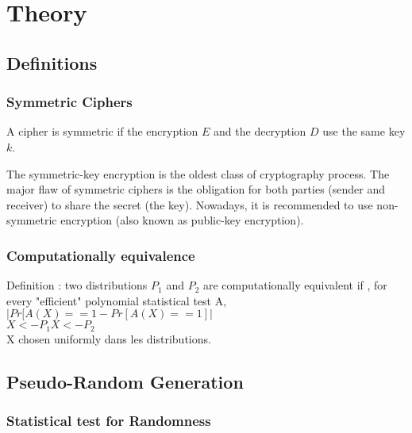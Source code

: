 \chapter{Theory}

\section{Definitions}

\subsection{Symmetric Ciphers}

\begin{mydef}
\begin{minipage}[t]{0.8\textwidth}
    A cipher is symmetric if the encryption $E$ and the decryption $D$ use the same key $k$.
\end{minipage}
\end{mydef}

The symmetric-key encryption is the oldest class of cryptography process. The major flaw of symmetric ciphers is the obligation for both parties (sender and receiver) to share the secret (the key). Nowadays, it is recommended to use non-symmetric encryption (also known as public-key encryption).

\subsection{Computationally equivalence}
Definition : two distributions $P_1$ and $P_2$ are computationally equivalent if , for every "efficient" polynomial statistical test A, \\

$ | Pr[A(X) == 1  - Pr[A(X) == 1] |  $ \\
$   X <- P_1      X <- P_2              $ \\
X chosen uniformly dans les distributions.


\section{ Pseudo-Random Generation }

\subsection{Statistical test for Randomness}


